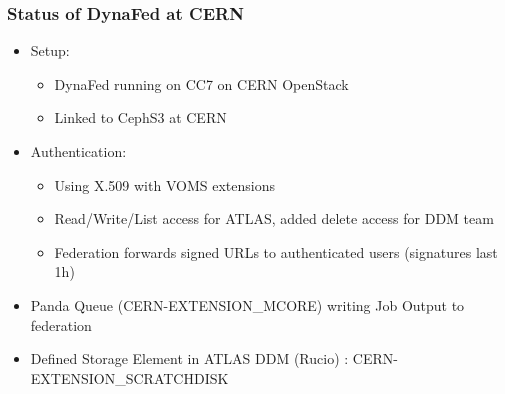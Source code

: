 \documentclass{beamer}
\begin{document}
\begin{frame}
  \frametitle{Status of DynaFed at CERN}
  \begin{itemize}
    \item Setup:
    \begin{itemize}
      \item DynaFed running on CC7 on CERN OpenStack
      \item Linked to CephS3 at CERN
    \end{itemize}
		\item Authentication:
    \begin{itemize}
      \item Using X.509 with VOMS extensions
      \item Read/Write/List access for ATLAS, added delete access for DDM team
      \item Federation forwards signed URLs to authenticated users (signatures last 1h)
    \end{itemize}
		\item Panda Queue (CERN-EXTENSION\_MCORE) writing Job Output to federation
		\item Defined Storage Element in ATLAS DDM (Rucio) : CERN-EXTENSION\_SCRATCHDISK
  \end{itemize}

\end{frame}
\end{document}
